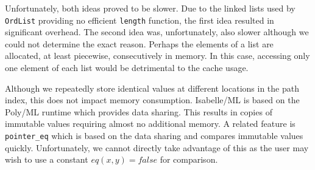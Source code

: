 Unfortunately, both ideas proved to be slower. Due to the linked lists used by \lstinline{OrdList} providing no efficient \lstinline{length} function, the first idea resulted in significant overhead. The second idea was, unfortunately, also slower although we could not determine the exact reason. Perhaps the elements of a list are allocated, at least piecewise, consecutively in memory. In this case, accessing only one element of each list would be detrimental to the cache usage.

Although we repeatedly store identical values at different locations in the path index, this does not impact memory consumption. Isabelle/ML is based on the Poly/ML runtime \cite{noauthor_polyml_nodate} which provides data sharing. This results in copies of immutable values requiring almost no additional memory. A related feature is \lstinline{pointer_eq} \cite{noauthor_polyml_nodate-1} which is based on the data sharing and compares immutable values quickly. Unfortunately, we cannot directly take advantage of this as the user may wish to use a constant $eq (x,y) = false$ for comparison.
